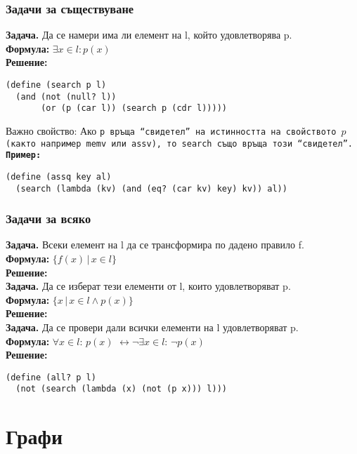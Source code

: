 \documentclass[alsotrans]{beamerswitch}
\begin{document}
\begin{frame}[fragile]
  \frametitle{Задачи за съществуване}

  \textbf{Задача.} Да се намери има ли елемент на l, който удовлетворява p.\\
  \pause
  \textbf{Формула:} $\exists x\in l: p(x)$\\
  \pause
  \textbf{Решение:}
\begin{lstlisting}
(define (search p l)
  (and (not (null? l))
       (or (p (car l)) (search p (cdr l)))))
\end{lstlisting}
  \pause
  \alert{Важно свойство:} Ако \tt p връща ``свидетел'' на истинността на свойството $p$ (както например \tt{memv} или \tt{assv}), то \tt{search} също връща този ``свидетел''.\\
  \pause
  \textbf{Пример:}
\begin{lstlisting}
(define (assq key al)
  (search (lambda (kv) (and (eq? (car kv) key) kv)) al))
\end{lstlisting}
\end{frame}

\begin{frame}[fragile]
  \frametitle{Задачи за всяко}
  \textbf{Задача.} Всеки елемент на l да се трансформира по дадено правило f.\\
  \pause
  \textbf{Формула:} $\{f(x)\,|\,x \in l \}$\\
  \pause
  \textbf{Решение:} \\[2ex]
  \pause
  \textbf{Задача.} Да се изберат тези елементи от l, които удовлетворяват p.\\
  \pause
  \textbf{Формула:} $\{x\,|\,x \in l \wedge p(x) \}$\\
  \pause
  \textbf{Решение:} \\[2ex]
  \pause
  \textbf{Задача.} Да се провери дали всички елементи на l удовлетворяват p.\\
  \pause
  \textbf{Формула:} $\forall x\in l:\,p(x)$ \pause $\leftrightarrow \neg \exists x\in l:\,\neg p(x)$\\
  \pause
  \textbf{Решение:}
\begin{lstlisting}
(define (all? p l)
  (not (search (lambda (x) (not (p x))) l)))
\end{lstlisting}
\end{frame}

\section{Графи}
\end{document}
